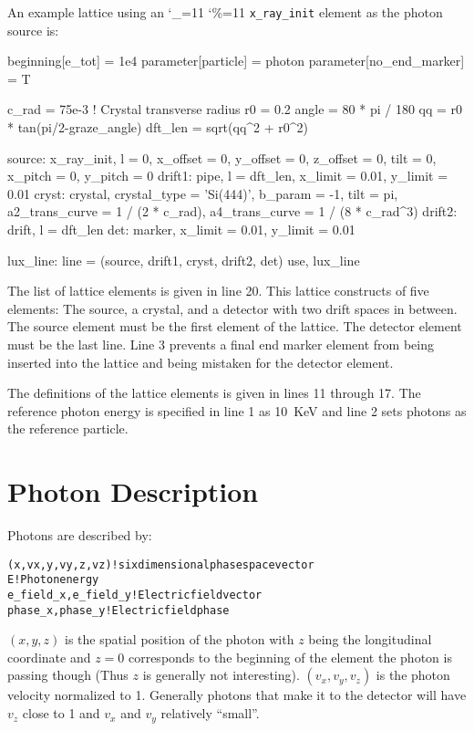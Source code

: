\documentclass[11pt]{article}
\newcommand\ttcmd{\begingroup\catcode`\_=11 \catcode`\%=11 \dottcmd}
\newcommand\dottcmd[1]{\texttt{#1}\endgroup}
\newcommand{\vn}{\ttcmd}
\newenvironment{example}
  {\vspace{\ExBeg} \begin{alltt}}
  {\end{alltt} \vspace{\ExEnd}}
\newlength{\ExBeg}
\newlength{\ExEnd}
\begin{document}
An example lattice using an \vn{x_ray_init} element as the photon source is:
\begin{listing}{1}
beginning[e_tot] = 1e4
parameter[particle] = photon
parameter[no_end_marker] = T

c_rad = 75e-3  ! Crystal transverse radius 
r0 = 0.2
angle  = 80 * pi / 180
qq = r0 * tan(pi/2-graze_angle)
dft_len = sqrt(qq^2 + r0^2)

source: x_ray_init, l = 0, x_offset = 0, y_offset = 0, z_offset = 0, tilt = 0,
        x_pitch = 0, y_pitch = 0
drift1: pipe, l = dft_len, x_limit = 0.01, y_limit = 0.01
cryst: crystal, crystal_type = 'Si(444)', b_param = -1, tilt = pi, 
        a2_trans_curve = 1 / (2 * c_rad), a4_trans_curve = 1 / (8 * c_rad^3)
drift2: drift, l = dft_len
det: marker, x_limit = 0.01, y_limit = 0.01

lux_line: line = (source, drift1, cryst, drift2, det)
use, lux_line
\end{listing}

The list of lattice elements is given in line 20.  This lattice
constructs of five elements: The source, a crystal, and a detector
with two drift spaces in between. The source element must be the first
element of the lattice. The detector element must be the last
line. Line 3 prevents a final end marker element from being inserted
into the lattice and being mistaken for the detector element.

The definitions of the lattice elements is given in lines 11 through
17.  The reference photon energy is specified in line 1 as 10~KeV and
line 2 sets photons as the reference particle.

\section{Photon Description}
\label{s:photon.descrip}

Photons are described by:
\begin{example}
  (x, vx, y, vy, z, vz)   ! six dimensional phase space vector 
  E                       ! Photon energy 
  e_field_x, e_field_y    ! Electric field vector
  phase_x, phase_y        ! Electric field phase 
\end{example}
$(x, y, z)$ is the spatial position of the photon with $z$ being the
longitudinal coordinate and $z=0$ corresponds to the beginning of the
element the photon is passing though (Thus $z$ is generally not
interesting). $(v_x, v_y, v_z)$ is the photon velocity normalized to 1.
Generally photons that make it to the detector will have $v_z$ close to
1 and $v_x$ and $v_y$ relatively ``small''.
\end{document}
